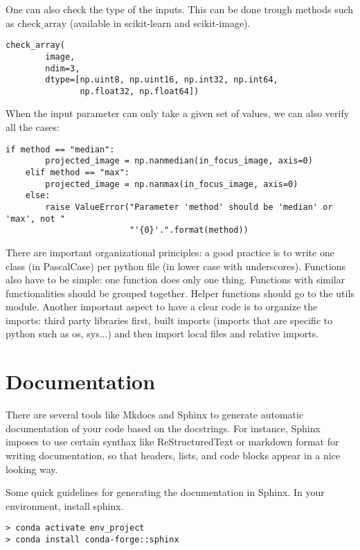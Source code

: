 \documentclass[24pt]{article}
\begin{document}
One can also check the type of the inputs. This can be done trough methods such as $\text{check\_array}$ (available in scikit-learn and scikit-image).


\begin{lstlisting}
check_array(
        image,
        ndim=3,
        dtype=[np.uint8, np.uint16, np.int32, np.int64,
               np.float32, np.float64])
\end{lstlisting}

When the input parameter can only take a given set of values, we can also verify all the cases:  

\begin{lstlisting}
if method == "median":
        projected_image = np.nanmedian(in_focus_image, axis=0)
    elif method == "max":
        projected_image = np.nanmax(in_focus_image, axis=0)
    else:
        raise ValueError("Parameter 'method' should be 'median' or 'max', not "
                         "'{0}'.".format(method))
\end{lstlisting}




There are important organizational principles: a good practice is to write one class (in PascalCase) per python file (in lower case with underscores). Functions also have to be simple: one function does only one thing. Functions with similar functionalities should be grouped together. Helper functions should go to the utils module. 
Another important aspect to have a clear code is to organize the imports: third party libraries first, built imports (imports that are specific to python such as os, sys...) and then import local files and relative imports. 



\section{Documentation}

There are several tools like Mkdocs and Sphinx to generate automatic documentation of your code based on the docstrings.  For instance, Sphinx imposes to use certain synthax like ReStructuredText or markdown format for writing documentation, so that headers, lists, and code blocks appear in a nice looking way.

 Some quick guidelines for generating the documentation in Sphinx. In your 
 environment, install sphinx.

\begin{lstlisting}
> conda activate env_project
> conda install conda-forge::sphinx
\end{lstlisting}
\end{document}
